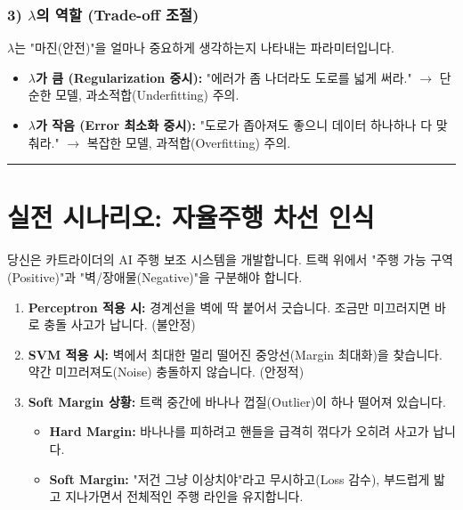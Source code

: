 \documentclass[11pt,a4paper]{book}
\theoremstyle{definition}
\begin{document}
\subsubsection*{3) $\lambda$의 역할 (Trade-off 조절)}
$\lambda$는 "마진(안전)"을 얼마나 중요하게 생각하는지 나타내는 파라미터입니다.
\begin{itemize}
    \item \textbf{$\lambda$가 큼 (Regularization 중시):}
    "에러가 좀 나더라도 도로를 넓게 써라."
    $\rightarrow$ 단순한 모델, 과소적합(Underfitting) 주의.
    \item \textbf{$\lambda$가 작음 (Error 최소화 중시):}
    "도로가 좁아져도 좋으니 데이터 하나하나 다 맞춰라."
    $\rightarrow$ 복잡한 모델, 과적합(Overfitting) 주의.
\end{itemize}

\vspace{0.5cm}\hrule\vspace{0.5cm}

\section{실전 시나리오: 자율주행 차선 인식}

\begin{storybox}[title={Scenario: 넥슨 카트라이더 자율주행 모드}]
당신은 카트라이더의 AI 주행 보조 시스템을 개발합니다. 트랙 위에서 "주행 가능 구역(Positive)"과 "벽/장애물(Negative)"을 구분해야 합니다.
\end{storybox}

\begin{enumerate}
    \item \textbf{Perceptron 적용 시:}
    경계선을 벽에 딱 붙어서 긋습니다. 조금만 미끄러지면 바로 충돌 사고가 납니다. (불안정)
    
    \item \textbf{SVM 적용 시:}
    벽에서 최대한 멀리 떨어진 중앙선(Margin 최대화)을 찾습니다. 약간 미끄러져도(Noise) 충돌하지 않습니다. (안정적)
    
    \item \textbf{Soft Margin 상황:}
    트랙 중간에 바나나 껍질(Outlier)이 하나 떨어져 있습니다.
    \begin{itemize}
        \item \textbf{Hard Margin:} 바나나를 피하려고 핸들을 급격히 꺾다가 오히려 사고가 납니다.
        \item \textbf{Soft Margin:} "저건 그냥 이상치야"라고 무시하고(Loss 감수), 부드럽게 밟고 지나가면서 전체적인 주행 라인을 유지합니다.
    \end{itemize}
\end{enumerate}
\end{document}
